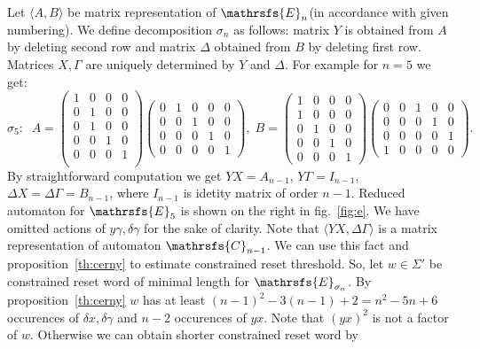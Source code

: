 \documentclass[11pt]{llncs}
\newcommand{\G}{\Gamma}
\newcommand{\D}{\Delta}
\newcommand{\g}{\gamma}
\newcommand{\dl}{\delta}
\begin{document}
Let $\langle A,B\rangle$ be matrix representation of $\mathrsfs{E}_n$(in accordance with given numbering).
We define decomposition $\sigma_n$ as follows: matrix $Y$ is obtained from $A$ by deleting second row and matrix $\D$
obtained from $B$ by deleting first row. %
Matrices $X, \G$ are uniquely 
determined by $Y$ and $\D$.
For example for $n = 5$ we get: 
$$\sigma_5: \;\;
A = 
\left(
\begin{smallmatrix}
1&0&0&0\\
0&1&0&0\\
0&1&0&0\\
0&0&1&0\\
0&0&0&1\\
\end{smallmatrix}
\right)
\left(
\begin{smallmatrix}
0&1&0&0&0\\
0&0&1&0&0\\
0&0&0&1&0\\
0&0&0&0&1
\end{smallmatrix}
\right),\;
B = 
\left(
\begin{smallmatrix}
1&0&0&0\\
1&0&0&0\\
0&1&0&0\\
0&0&1&0\\
0&0&0&1
\end{smallmatrix}
\right)
\left(
\begin{smallmatrix}
0&0&1&0&0\\
0&0&0&1&0\\
0&0&0&0&1\\
1&0&0&0&0
\end{smallmatrix}
\right).
$$
By straightforward computation we get $YX = A_{n - 1}$, $Y\G = I_{n - 1}$, $\D X = \D\G = B_{n - 1}$,
where $I_{n - 1}$ is idetity matrix of order $n - 1$.
Reduced automaton for $\mathrsfs{E}_5$ is shown on the right in fig.~\ref{fig:e}.
We have omitted actions of $y\g, \dl \g$ for the sake of clarity.
Note that $\langle YX, \D\G\rangle$ is a matrix representation of automaton $\mathrsfs{C}_{n - 1}$. We can use this fact
and proposition~\ref{th:cerny} to estimate constrained reset threshold. 
So, let $w \in \Sigma'$ be constrained reset word of minimal length for $\mathrsfs{E}_{\sigma_n}$.
By proposition~\ref{th:cerny} $w$ has at least $(n - 1)^2 - 3(n - 1) + 2 = n^2 - 5n + 6$ occurences of $\dl x, \dl \g$ and $n - 2$
occurences of $yx$. Note that $(yx)^2$ is not a factor of $w$. Otherwise we can obtain shorter constrained reset word by 
\end{document}
